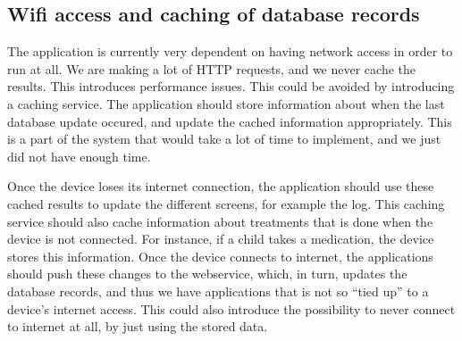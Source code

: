 
\subsection{Wifi access and caching of database records}
\label{sec:wifi-caching}
The application is currently very dependent on having network access in order to run at all. We are making a lot of HTTP requests, and we never cache the results. This introduces
performance issues. This could be avoided by introducing a caching service. The application should store 
information about when the last database update occured, and update the cached information appropriately. This is a part of the system that would take a lot of time to implement, 
and we just did not have enough time.  


Once the device loses its internet connection, the application should use these cached results to update the different screens, for example the log. 
This caching service should also cache information about treatments that is done when the device is not connected. For instance, if a child takes a 
medication, the device stores this information. Once the device connects to internet, the applications should push these changes to the webservice, 
which, in turn, updates the database records, and thus we have applications that is not so ``tied up'' to a device's internet access. This could also 
introduce the possibility to never connect to internet at all, by just using the stored data.   


  